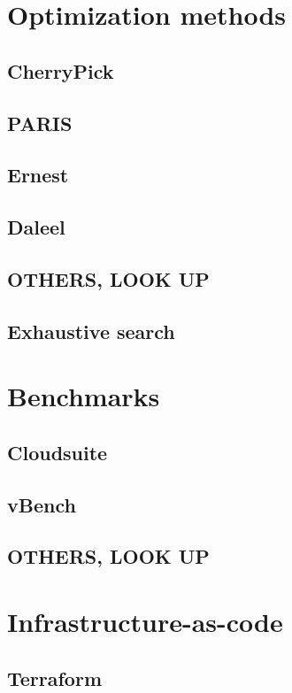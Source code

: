\documentclass{report}
\begin{document}
\section{Optimization methods}
\subsection{CherryPick}
\subsection{PARIS}
\subsection{Ernest}
\subsection{Daleel}
\subsection{OTHERS, LOOK UP}
\subsection{Exhaustive search}
\section{Benchmarks}
\subsection{Cloudsuite}
\subsection{vBench}
\subsection{OTHERS, LOOK UP}
\section{Infrastructure-as-code}
\subsection{Terraform}
\end{document}
